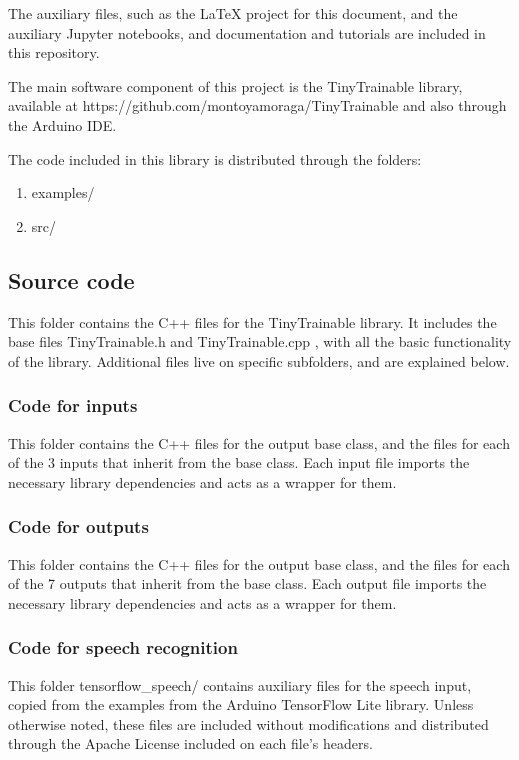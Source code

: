 The auxiliary files, such as the LaTeX project for this document, and the auxiliary Jupyter notebooks, and documentation and tutorials are included in this repository.

The main software component of this project is the TinyTrainable library, available at https://github.com/montoyamoraga/TinyTrainable and also through the Arduino IDE.

The code included in this library is distributed through the folders:

\begin{enumerate}
  \item examples/
  \item src/
\end{enumerate}

\subsection{Source code}

This folder contains the C++ files for the TinyTrainable library. It includes the base files TinyTrainable.h and TinyTrainable.cpp , with all the basic functionality of the library. Additional files live on specific subfolders, and are explained below.

\subsubsection{Code for inputs}

This folder contains the C++ files for the output base class, and the files for each of the 3 inputs that inherit from the base class. Each input file imports the necessary library dependencies and acts as a wrapper for them.

\subsubsection{Code for outputs}

This folder contains the C++ files for the output base class, and the files for each of the 7 outputs that inherit from the base class. Each output file imports the necessary library dependencies and acts as a wrapper for them.

\subsubsection{Code for speech recognition}

This folder tensorflow{\_}speech/ contains auxiliary files for the speech input, copied from the examples from the Arduino TensorFlow Lite library. Unless otherwise noted, these files are included without modifications and distributed through the Apache License included on each file's headers.

